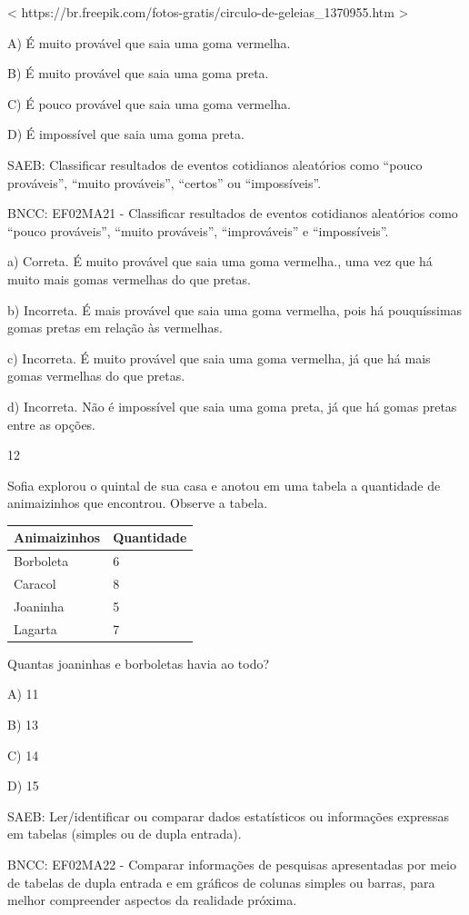 \begin{escolha}
\begin{escolha}
{{{{{{{{\textless{}
https://br.freepik.com/fotos-gratis/circulo-de-geleias\_1370955.htm
\textgreater{}

A) É muito provável que saia uma goma vermelha.

B) É muito provável que saia uma goma preta.

C) É pouco provável que saia uma goma vermelha.

D) É impossível que saia uma goma preta.

SAEB: Classificar resultados de eventos cotidianos aleatórios
como ``pouco prováveis'', ``muito prováveis'', ``certos'' ou
``impossíveis''.

BNCC: EF02MA21 - Classificar resultados de eventos cotidianos aleatórios
como ``pouco prováveis'', ``muito prováveis'', ``improváveis'' e
``impossíveis''.

a) Correta. É muito provável que saia uma goma vermelha., uma vez que há
muito mais gomas vermelhas do que pretas.

b) Incorreta. É mais provável que saia uma goma vermelha, pois há
pouquíssimas gomas pretas em relação às vermelhas.

c) Incorreta. É muito provável que saia uma goma vermelha, já que há
mais gomas vermelhas do que pretas.

d) Incorreta. Não é impossível que saia uma goma preta, já que há gomas
pretas entre as opções.

\num{12}

Sofia explorou o quintal de sua casa e anotou em uma tabela a quantidade
de animaizinhos que encontrou. Observe a tabela.

\begin{longtable}[]{@{}ll@{}}
\toprule
Animaizinhos & Quantidade\tabularnewline
\midrule
\endhead
Borboleta & 6\tabularnewline
Caracol & 8\tabularnewline
Joaninha & 5\tabularnewline
Lagarta & 7\tabularnewline
\bottomrule
\end{longtable}

Quantas joaninhas e borboletas havia ao todo?

A) 11

B) 13

C) 14

D) 15

SAEB: Ler/identificar ou comparar dados estatísticos ou
informações expressas em tabelas (simples ou de dupla entrada).

BNCC: EF02MA22 - Comparar informações de pesquisas apresentadas por meio
de tabelas de dupla entrada e em gráficos de colunas simples ou barras,
para melhor compreender aspectos da realidade próxima.

}}}}}}}}
\end{escolha}
\end{escolha}
